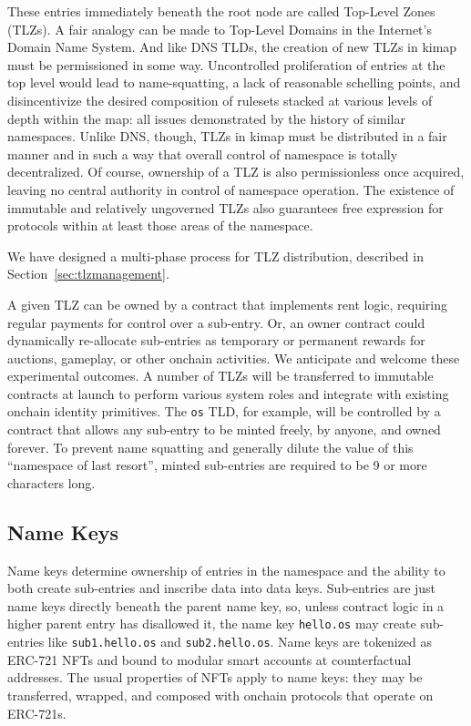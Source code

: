 \documentclass[runningheads]{llncs}
\begin{document}
These entries immediately beneath the root node are called Top-Level Zones (TLZs).
A fair analogy can be made to Top-Level Domains in the Internet's Domain Name System.
And like DNS TLDs, the creation of new TLZs in kimap must be permissioned in some way.
Uncontrolled proliferation of entries at the top level would lead to name-squatting, a lack of reasonable schelling points, and disincentivize the desired composition of rulesets stacked at various levels of depth within the map: all issues demonstrated by the history of similar namespaces.
Unlike DNS, though, TLZs in kimap must be distributed in a fair manner and in such a way that overall control of namespace is totally decentralized.
Of course, ownership of a TLZ is also permissionless once acquired, leaving no central authority in control of namespace operation.
The existence of immutable and relatively ungoverned TLZs also guarantees free expression for protocols within at least those areas of the namespace.

We have designed a multi-phase process for TLZ distribution, described in Section~\ref{sec:tlzmanagement}.

A given TLZ can be owned by a contract that implements rent logic, requiring regular payments for control over a sub-entry.
Or, an owner contract could dynamically re-allocate sub-entries as temporary or permanent rewards for auctions, gameplay, or other onchain activities.
We anticipate and welcome these experimental outcomes.
A number of TLZs will be transferred to immutable contracts at launch to perform various system roles and integrate with existing onchain identity primitives.
The \verb|os| TLD, for example, will be controlled by a contract that allows any sub-entry to be minted freely, by anyone, and owned forever.
To prevent name squatting and generally dilute the value of this ``namespace of last resort'', minted sub-entries are required to be 9 or more characters long.

\subsection{Name Keys}

Name keys determine ownership of entries in the namespace and the ability to both create sub-entries and inscribe data into data keys. Sub-entries are just name keys directly beneath the parent name key, so, unless contract logic in a higher parent entry has disallowed it, the name key \verb|hello.os| may create sub-entries like \verb|sub1.hello.os| and \verb|sub2.hello.os|.
Name keys are tokenized as ERC-721 NFTs and bound to modular smart accounts at counterfactual addresses.
The usual properties of NFTs apply to name keys: they may be transferred, wrapped, and composed with onchain protocols that operate on ERC-721s.
\end{document}

